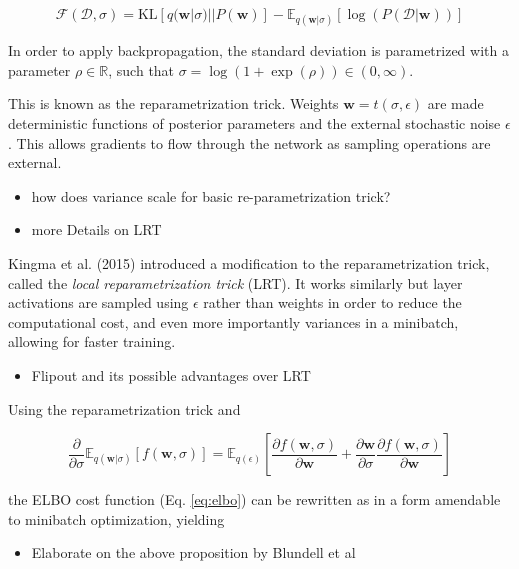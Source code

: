 	\begin{equation}
	\label{eq:elbo}
		\mathcal{F}(\mathcal{D}, \sigma) = 
		\text{KL}[q(\pmb{w}|\sigma) || P(\pmb{w})] - \mathbb{E}_{q(\pmb{w}|\sigma)}[\log(P(\mathcal{D}|\pmb{w}))]
	\end{equation}

	In order to apply backpropagation, the standard deviation is parametrized with a parameter $\rho \in \mathbb{R}$, such that $\sigma = \log(1 + \exp(\rho)) \in (0,\infty)$. 
	
	This is known as the reparametrization trick. Weights $\pmb{w} = t(\sigma, \epsilon)$ are made deterministic functions of posterior parameters and the external stochastic noise $\epsilon$. This allows gradients to flow through the network as sampling operations are external. 
	
	\begin{itemize}
		\item how does variance scale for basic re-parametrization trick?
		\item more Details on LRT
	\end{itemize}

	Kingma et al. (2015) \cite{kingma_variational_2015} introduced a modification to the reparametrization trick, called the \textit{local reparametrization trick} (LRT). It works similarly but layer activations are sampled using $\epsilon$ rather than weights in order to reduce the computational cost, and even more importantly variances in a minibatch, allowing for faster training. 
	
	\begin{itemize}
		\item Flipout and its possible advantages over LRT
	\end{itemize}
	
	Using the reparametrization trick and 
	
	\begin{equation}
	\frac{\partial}{\partial \sigma} \mathbb{E}_{q(\pmb{w}|\sigma)}[f(\pmb{w}, \sigma)] =
	\mathbb{E}_{q(\epsilon)}[\frac{\partial f(\pmb{w}, \sigma)}{\partial \pmb{w}} + \frac{\partial \pmb{w}}{\partial \sigma}
	\frac{\partial f(\pmb{w}, \sigma)}{\partial \pmb{w}}]
	\end{equation}
	
	the ELBO cost function (Eq. \ref{eq:elbo}) can be rewritten as in a form amendable to minibatch optimization, yielding
	
	\begin{itemize}
		\item Elaborate on the above proposition by Blundell et al
	\end{itemize}
	
